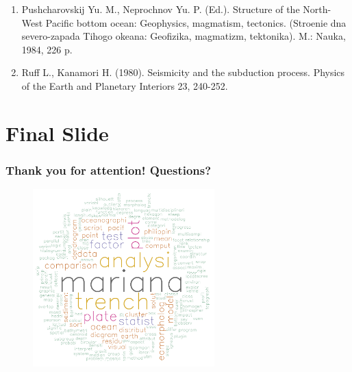 \documentclass[pdflatex,compress,10pt,
	xcolor={dvipsnames,dvipsnames,svgnames,x11names,table},
	hyperref={colorlinks = true,breaklinks = true, urlcolor = NavyBlue, breaklinks = true}]{beamer}
\begin{document}
\begin{frame}[allowframebreaks]
\begin{enumerate}
	\item Pushcharovskij Yu. M., Neprochnov Yu. P. (Ed.). Structure of the North-West Pacific bottom ocean: Geophysics, magmatism, tectonics. (Stroenie dna severo-zapada Tihogo okeana: Geofizika, magmatizm, tektonika). M.: Nauka, 1984, 226 p.
	\item Ruff L., Kanamori H. (1980). Seismicity and the subduction process. Physics of the Earth and Planetary Interiors 23, 240-252.
\end{enumerate}
\end{frame}

\section{Final Slide}
\begin{frame}\frametitle{Thank you for attention! Questions?}

\begin{figure}[H]
	\centering
		\includegraphics[width=7cm]{Wordcloud.jpg}
\end{figure}		
\end{frame}
 
\end{document}
